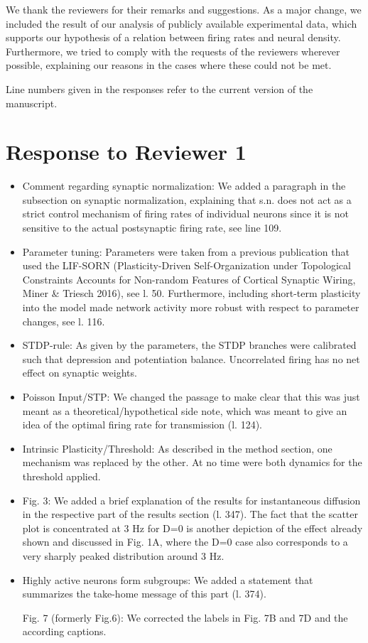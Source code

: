 \documentclass[10pt,a4paper]{article}
\begin{document}
We thank the reviewers for their remarks and suggestions. As a major change, we included the result of our analysis of publicly available experimental data, which supports our hypothesis of a relation between firing rates and neural density. Furthermore, we tried to comply with the requests of the reviewers wherever possible, explaining our reasons in the cases where these could not be met.

Line numbers given in the responses refer to the current version of the manuscript.

\section{Response to Reviewer 1}
\begin{itemize}
\item Comment regarding synaptic normalization: We added a paragraph in the subsection on synaptic normalization, explaining that s.n. does not act as a strict control mechanism of firing rates of individual neurons since it is not sensitive to the actual postsynaptic firing rate, see line 109.

\item Parameter tuning: Parameters were taken from a previous publication that used the LIF-SORN (Plasticity-Driven Self-Organization under Topological Constraints Accounts for Non-random Features of Cortical Synaptic Wiring, Miner \& Triesch 2016), see l. 50. Furthermore, including short-term plasticity into the model made network activity more robust with respect to parameter changes, see l. 116.

\item STDP-rule: As given by the parameters, the STDP branches were calibrated such that depression and potentiation balance. Uncorrelated firing has no net effect on synaptic weights.

\item Poisson Input/STP: We changed the passage to make clear that this was just meant as a theoretical/hypothetical side note, which was meant to give an idea of the optimal firing rate for transmission (l. 124).

\item Intrinsic Plasticity/Threshold: As described in the method section, one mechanism was replaced by the other. At no time were both dynamics for the threshold applied.

\item Fig. 3: We added a brief explanation of the results for instantaneous diffusion in the respective part of the results section (l. 347). The fact that the scatter plot is concentrated at 3 Hz for D=0 is another depiction of the effect already shown and discussed in Fig. 1A, where the D=0 case also corresponds to a very sharply peaked distribution around 3 Hz.

\item Highly active neurons form subgroups: We added a statement that summarizes the take-home message of this part (l. 374).

Fig. 7 (formerly Fig.6): We corrected the labels in Fig. 7B and 7D and the according captions.
\end{itemize}
\end{document}
